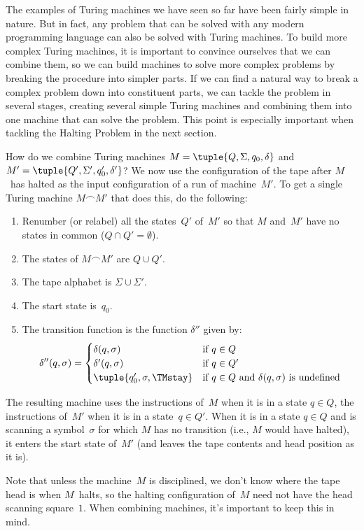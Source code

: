\documentclass[../../../include/open-logic-section]{subfiles}
\begin{document}

\begin{explain}
The examples of Turing machines we have seen so far have been fairly
simple in nature. But in fact, any problem that can be solved with any
modern programming language can also be solved with Turing machines.
To build more complex Turing machines, it is important to convince
ourselves that we can combine them, so we can build machines to solve
more complex problems by breaking the procedure into simpler parts.
If we can find a natural way to break a complex problem down into
constituent parts, we can tackle the problem in several stages,
creating several simple Turing machines and combining them into one
machine that can solve the problem. This point is especially important
when tackling the Halting Problem in the next section.

How do we combine Turing machines $M = \tuple{Q, \Sigma, q_0, \delta}$
and~$M' = \tuple{Q', \Sigma', q_0', \delta'}$?  We now use the
configuration of the tape after $M$~has halted as the input
configuration of a run of machine~$M'$.  To get a single Turing
machine $M \frown M'$ that does this, do the following:
\begin{enumerate}
    \item Renumber (or relabel) all the states~$Q'$ of~$M'$ so that $M$
    and~$M'$ have no states in common ($Q \cap Q' = \emptyset$).
    \item The states of $M \frown M'$ are $Q \cup Q'$.
    \item The tape alphabet is $\Sigma \cup \Sigma'$.
    \item The start state is~$q_0$.
    \item The transition function is the function $\delta''$ given by:
    \[\delta''(q,\sigma) =
    \begin{cases}
      \delta(q,\sigma) & \text{if $q \in Q$}\\
      \delta'(q,\sigma) & \text{if $q \in Q'$}\\
      \tuple{q_0', \sigma, \TMstay} & \text{if $q \in Q$ and
      $\delta(q,\sigma)$ is undefined}
    \end{cases}\]
\end{enumerate}
The resulting machine uses the instructions of~$M$ when it is in a
state $q \in Q$, the instructions of~$M'$ when it is in a state~$q \in
Q'$. When it is in a state $q \in Q$ and is scanning a symbol~$\sigma$
for which $M$ has no transition (i.e., $M$ would have halted), it
enters the start state of~$M'$ (and leaves the tape contents and head
position as it is).

Note that unless the machine~$M$ is disciplined, we don't know where
the tape head is when $M$~halts, so the halting configuration of~$M$
need not have the head scanning square~$1$. When combining machines,
it's important to keep this in mind.
\end{explain}
\end{document}
